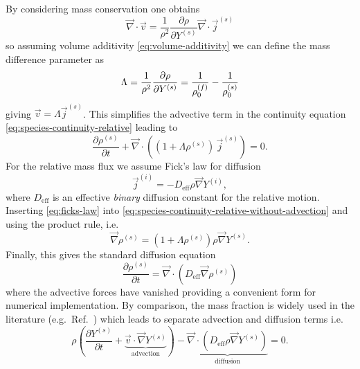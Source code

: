 \documentclass[11pt,twoside]{report}
\begin{document}
By considering mass conservation one obtains
\begin{equation*}
  \vec{\nabla} \cdot \vec{v}
  =
  \frac{1}{\rho^2}
  \frac{\partial \rho}{\partial Y^{(s)}}
  \vec{\nabla} \cdot \vec{j}^{(s)}
\end{equation*}
so assuming volume additivity \eqref{eq:volume-additivity} we can define the mass difference parameter as
\begin{equation}\label{eq:lambda}
  \Lambda
  =
  \frac{1}{\rho^2} \frac{\partial \rho}{\partial Y^{(s)}} \\
  =
  \frac{1}{\rho^{(f)}_0} -
  \frac{1}{\rho^{(s)}_0}
\end{equation}
giving $\vec{v} = \Lambda \vec{j}^{(s)}$.
This simplifies the advective term in the continuity equation \eqref{eq:species-continuity-relative} leading to
\begin{equation}\label{eq:species-continuity-relative-without-advection}
  \frac{\partial \rho^{(s)}}{\partial t} +
  \vec{\nabla} \cdot \left(
  (1 + \Lambda \rho^{(s)}) \, \vec{j}^{(s)}
  \right) = 0.
\end{equation}
For the relative mass flux we assume Fick's law for diffusion
\begin{equation}\label{eq:ficks-law}
  \vec{j}^{(i)} = -D_\mathrm{eff} \rho \vec{\nabla} Y^{(i)},
\end{equation}
where $D_\mathrm{eff}$ is an effective \emph{binary} diffusion constant for the relative motion.
Inserting \eqref{eq:ficks-law} into \eqref{eq:species-continuity-relative-without-advection} and using the product rule, i.e.\
\begin{equation*}
  \vec{\nabla} \rho^{(s)}
  =
  \left(
  1 +
  \Lambda \rho^{(s)}
  \right)
  \rho
  \vec{\nabla} Y^{(s)}.
\end{equation*}
Finally, this gives the standard diffusion equation
\begin{equation}\label{eq:final-diffusion}
  \frac{\partial \rho^{(s)}}{\partial t}
  =
  \vec{\nabla} \cdot \left(
  D_\mathrm{eff} \vec{\nabla} \rho^{(s)}
  \right)
\end{equation}
where the advective forces have vanished providing a convenient form for numerical implementation.
By comparison, the mass fraction is widely used in the literature (e.g.\ Ref.\ \cite{HandscombCES2009}) which leads to separate advection and diffusion terms i.e.\
\begin{equation*}
  \rho \left(
  \frac{\partial Y^{(s)}}{\partial t} +
  \underbrace{\vec{v} \cdot \vec{\nabla} Y^{(s)}}_\textrm{advection}
  \right)
  -
  \underbrace{\vec{\nabla} \cdot (D_{\textrm{eff}} \rho \vec{\nabla} Y^{(s)})}_\textrm{diffusion}
  = 0.
\end{equation*}
\end{document}
